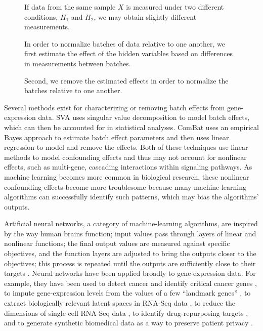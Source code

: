 \documentclass[11pt]{article}
\begin{document}
\begin{figure}
{\begin{enumerate*}[(a)]
		\item If data from the same sample $X$ is measured under two different conditions, $H_1$ and $H_2$, we may obtain slightly different measurements.
		\item In order to normalize batches of data relative to one another, we first estimate the effect of the hidden variables based on differences in measurements between batches.
		\item Second, we remove the estimated effects in order to normalize the batches relative to one another.
	\end{enumerate*}
	}
	\label{fig:workflow}
\end{figure}

Several methods exist for characterizing or removing batch effects from gene-expression data.
SVA uses singular value decomposition to model batch effects, which can then be accounted for in statistical analyses\citep{leek_capturing_2007}.
ComBat uses an empirical Bayes approach to estimate batch effect parameters and then uses linear regression to model and remove the effects\citep{johnson_adjusting_2007}.
Both of these techniques use linear methods to model confounding effects and thus may not account for nonlinear effects, such as multi-gene, cascading interactions within signaling pathways.
As machine learning becomes more common in biological research, these nonlinear confounding effects become more troublesome because many machine-learning algorithms can successfully identify such patterns, which may bias the algorithms' outputs.

Artificial neural networks, a category of machine-learning algorithms, are inspired by the way human brains function; input values pass through layers of linear and nonlinear functions; the final output values are measured against specific objectives, and the function layers are adjusted to bring the outputs closer to the objectives; this process is repeated until the outputs are sufficiently close to their targets \citep{schmidhuber_deep_2015}.%
Neural networks have been applied broadly to gene-expression data. For example, they have been used to detect cancer and identify critical cancer genes \citep{danaee_deep_2016}, to impute gene-expression levels from the values of a few ``landmark genes'' \citep{chen_gene_2016}, to extract biologically relevant latent spaces in RNA-Seq data \citep{way_extracting_2017}, to reduce the dimensions of single-cell RNA-Seq data \citep{lin_using_2017}, to identify drug-repurposing targets \citep{aliper_deep_2016}, and to generate synthetic biomedical data as a way to preserve patient privacy \citep{beaulieu-jones_privacy-preserving_2017}.
\end{document}
